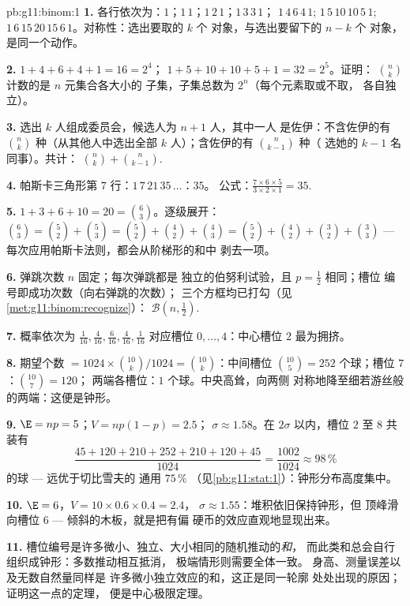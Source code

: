 \begin{solution}{pb:g11:binom:1}
\textbf{1.} 各行依次为：$1$；$1\,1$；$1\,2\,1$；$1\,3\,3\,1$；
$1\,4\,6\,4\,1$; $1\,5\,10\,10\,5\,1$;
$1\,6\,15\,20\,15\,6\,1$。对称性：选出要取的 $k$ 个
对象，与选出要留下的 $n - k$ 个
对象，是同一个动作。

\textbf{2.} $1 + 4 + 6 + 4 + 1 = 16 = 2^4$；
$1 + 5 + 10 + 10 + 5 + 1 = 32 = 2^5$。证明：
$\binom nk$ 计数的是 $n$ 元集合各大小的
子集，子集总数为 $2^n$（每个元素取或不取，
各自独立）。

\textbf{3.} 选出 $k$ 人组成委员会，候选人为 $n + 1$ 人，其中一人
是佐伊：不含佐伊的有 $\binom nk$ 种（从其他人中选出全部
$k$ 人）；含佐伊的有 $\binom{n}{k-1}$ 种（
选她的 $k - 1$ 名同事）。共计：
$\binom nk + \binom{n}{k-1}$.

\textbf{4.} 帕斯卡三角形第 $7$ 行：$1\,7\,21\,35\,\dots$：$35$。
公式：$\frac{7 \times 6 \times 5}{3 \times 2 \times 1} =
35$.

\textbf{5.} $1 + 3 + 6 + 10 = 20 = \binom63$。逐级展开：
$\binom63 = \binom52 + \binom53 = \binom52 + \binom42 +
\binom43 = \binom52 + \binom42 + \binom32 + \binom33$ ---
每次应用帕斯卡法则，都会从阶梯形的和中
剥去一项。

\textbf{6.} 弹跳次数 $n$ 固定；每次弹跳都是
独立的伯努利试验，且 $p = \frac12$ 相同；槽位
编号即成功次数（向右弹跳的次数）；
三个方框均已打勾（见\cref{met:g11:binom:recognize}）：
$\mathcal B\!\left(n, \frac12\right)$.

\textbf{7.} 概率依次为 $\frac{1}{16}, \frac{4}{16},
\frac{6}{16}, \frac{4}{16}, \frac{1}{16}$ 对应槽位
$0, \dots, 4$：中心槽位 $2$ 最为拥挤。

\textbf{8.} 期望个数 $= 1024 \times
\binom{10}{k}/1024 = \binom{10}{k}$：中间槽位
$\binom{10}{5} = 252$ 个球；槽位 $7$：$\binom{10}{7} = 120$；
两端各槽位：$1$ 个球。中央高耸，向两侧
对称地降至细若游丝般的两端：这便是钟形。

\textbf{9.} $\E = np = 5$；$V = np(1 - p) = 2.5$；
$\sigma \approx 1.58$。在 $2\sigma$ 以内，槽位 $2$ 至 $8$
共装有
\[
\frac{45 + 120 + 210 + 252 + 210 + 120 + 45}{1024}
= \frac{1002}{1024} \approx 98\,\%
\]
的球 --- 远优于切比雪夫的
通用 $75\,\%$
（见\cref{pb:g11:stat:1}）：钟形分布高度集中。

\textbf{10.} $\E = 6$，$V = 10 \times 0.6 \times 0.4 = 2.4$，
$\sigma \approx 1.55$：堆积依旧保持钟形，但
顶峰滑向槽位 $6$ --- 倾斜的木板，就是把有偏
硬币的效应直观地显现出来。

\textbf{11.} 槽位编号是许多微小、独立、大小相同的随机推动的\emph{和}，
而此类和总会自行组织成钟形：多数推动相互抵消，
极端情形则需要全体一致。
身高、测量误差以及无数自然量同样是
许多微小独立效应的和，这正是同一轮廓
处处出现的原因；证明这一点的定理，
便是中心极限定理。


\end{solution}

